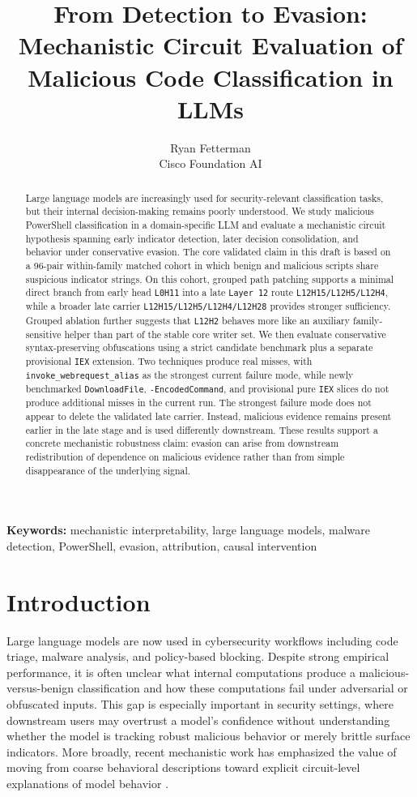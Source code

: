 \documentclass{article}
\title{From Detection to Evasion: Mechanistic Circuit Evaluation of Malicious Code Classification in LLMs}
\author{%
  Ryan Fetterman \\
  Cisco Foundation AI
}
\date{}
\begin{document}
\maketitle

\begin{abstract}
Large language models are increasingly used for security-relevant classification tasks, but their internal decision-making remains poorly understood. We study malicious PowerShell classification in a domain-specific LLM and evaluate a mechanistic circuit hypothesis spanning early indicator detection, later decision consolidation, and behavior under conservative evasion. The core validated claim in this draft is based on a 96-pair within-family matched cohort in which benign and malicious scripts share suspicious indicator strings. On this cohort, grouped path patching supports a minimal direct branch from early head \texttt{L0H11} into a late \texttt{Layer 12} route \texttt{L12H15/L12H5/L12H4}, while a broader late carrier \texttt{L12H15/L12H5/L12H4/L12H28} provides stronger sufficiency. Grouped ablation further suggests that \texttt{L12H2} behaves more like an auxiliary family-sensitive helper than part of the stable core writer set. We then evaluate conservative syntax-preserving obfuscations using a strict candidate benchmark plus a separate provisional \texttt{IEX} extension. Two techniques produce real misses, with \texttt{invoke\_webrequest\_alias} as the strongest current failure mode, while newly benchmarked \texttt{DownloadFile}, \texttt{-EncodedCommand}, and provisional pure \texttt{IEX} slices do not produce additional misses in the current run. The strongest failure mode does not appear to delete the validated late carrier. Instead, malicious evidence remains present earlier in the late stage and is used differently downstream. These results support a concrete mechanistic robustness claim: evasion can arise from downstream redistribution of dependence on malicious evidence rather than from simple disappearance of the underlying signal.
\end{abstract}

\textbf{Keywords:} mechanistic interpretability, large language models, malware detection, PowerShell, evasion, attribution, causal intervention

\section{Introduction}
Large language models are now used in cybersecurity workflows including code triage, malware analysis, and policy-based blocking. Despite strong empirical performance, it is often unclear what internal computations produce a malicious-versus-benign classification and how these computations fail under adversarial or obfuscated inputs. This gap is especially important in security settings, where downstream users may overtrust a model's confidence without understanding whether the model is tracking robust malicious behavior or merely brittle surface indicators. More broadly, recent mechanistic work has emphasized the value of moving from coarse behavioral descriptions toward explicit circuit-level explanations of model behavior \citep{ameisen2025attributiongraphs,lindsey2025biology}.
\end{document}

